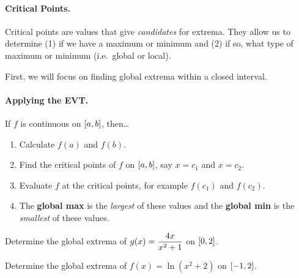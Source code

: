 \documentclass[12pt]{article}
\begin{document}
\vspace{1mm}

\paragraph{Critical Points.} Critical points are values that give \textit{candidates} for extrema. They allow us to determine (1) if we have a maximum or minimum and (2) if so, what type of maximum or minimum (i.e.\ global or local).

\vspace{3mm}


\newpage

First, we will focus on finding global extrema within a closed interval.

\vspace{5mm}


\vspace{50mm}

\paragraph{Applying the EVT.} If $f$ is continuous on $\left[ a,b \right]$, then\dots
\begin{enumerate}
	\item[\tc{1}] Calculate $f(a)$ and $f(b)$.
	\item[\tc{2}] Find the critical points of $f$ on $\left[ a,b \right]$, say $x=c_1$ and $x=c_2$. 
	\item[\tc{3}] Evaluate $f$ at the critical points, for example $f(c_1)$ and $f(c_2)$.
	\item[\tc{4}] The \textbf{global max} is the \textit{largest} of these values and the \textbf{global min} is the \textit{smallest} of these values.
\end{enumerate}

\vspace{3mm}

\Example Determine the global extrema of $g(x)=\displaystyle\frac{4x}{x^2+1}$ on $\left[ 0,2\right]$. 

\newpage

\Example Determine the global extrema of $f(x)=\ln(x^2+2)$ on $\left[ -1,2\right]$.
\end{document}

